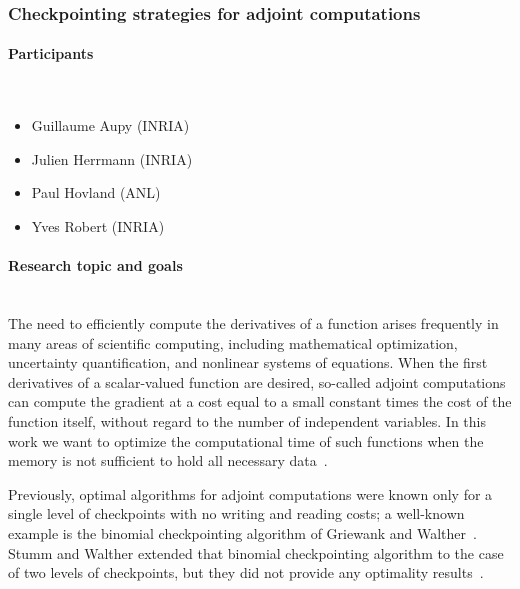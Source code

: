 

\subsubsection{Checkpointing strategies for adjoint computations \ongoing}
\label{sec.report.adjoint} 

\begin{refsection}

\paragraph{Participants}~\\

\begin{itemize}
	\item Guillaume Aupy (INRIA)
	\item Julien Herrmann (INRIA)
	\item Paul Hovland (ANL)
	\item Yves Robert (INRIA)
\end{itemize}


\paragraph{Research topic and goals}~\\
The need to efficiently compute the derivatives of a function arises frequently
in many areas of scientific computing, including mathematical optimization,
uncertainty quantification, and nonlinear systems of equations. When the first
derivatives of a scalar-valued function are desired, so-called adjoint
computations can compute the gradient at a cost equal to a small constant times
the cost of the function itself, without regard to the number of independent
variables.
In this work we want to optimize the computational time of such functions when
the memory is not sufficient to hold all  necessary data~\cite{Heimbach20051356}.

Previously, optimal algorithms for adjoint computations were known only for a
single level of checkpoints with no writing and reading costs; a well-known
example is the binomial checkpointing algorithm of Griewank and
Walther~\cite{griewank1992achieving,griewank2000algorithm}. Stumm and Walther
extended that binomial checkpointing algorithm to the case of two levels of
checkpoints, but they did not provide any optimality
results~\cite{stumm2009multistage}.


\end{refsection}
